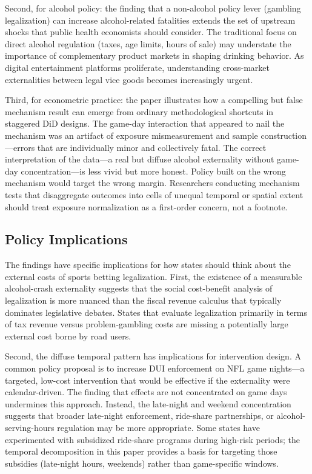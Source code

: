 \documentclass[12pt]{article}
\begin{document}
Second, for alcohol policy: the finding that a non-alcohol policy lever
(gambling legalization) can increase alcohol-related fatalities extends
the set of upstream shocks that public health economists should consider. The traditional focus on direct alcohol regulation (taxes, age
limits, hours of sale) may understate the importance of complementary
product markets in shaping drinking behavior. As digital entertainment
platforms proliferate, understanding cross-market externalities between
legal vice goods becomes increasingly urgent.

Third, for econometric practice: the paper illustrates how a compelling but false mechanism result can emerge from ordinary methodological shortcuts in staggered DiD designs. The game-day interaction that appeared to nail the mechanism was an artifact of exposure mismeasurement and sample construction---errors that are individually minor and collectively fatal. The correct interpretation of the data---a real but diffuse alcohol externality without game-day concentration---is less vivid but more honest. Policy built on the wrong mechanism would target the wrong margin. Researchers conducting mechanism tests that disaggregate outcomes into cells of unequal temporal or spatial extent should treat exposure normalization as a first-order concern, not a footnote.

\subsection{Policy Implications}

The findings have specific implications for how states should think about the external costs of sports betting legalization. First, the existence of a measurable alcohol-crash externality suggests that the social cost-benefit analysis of legalization is more nuanced than the fiscal revenue calculus that typically dominates legislative debates. States that evaluate legalization primarily in terms of tax revenue versus problem-gambling costs are missing a potentially large external cost borne by road users.

Second, the diffuse temporal pattern has implications for intervention design. A common policy proposal is to increase DUI enforcement on NFL game nights---a targeted, low-cost intervention that would be effective if the externality were calendar-driven. The finding that effects are not concentrated on game days undermines this approach. Instead, the late-night and weekend concentration suggests that broader late-night enforcement, ride-share partnerships, or alcohol-serving-hours regulation may be more appropriate. Some states have experimented with subsidized ride-share programs during high-risk periods; the temporal decomposition in this paper provides a basis for targeting those subsidies (late-night hours, weekends) rather than game-specific windows.
\end{document}
